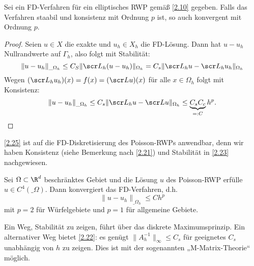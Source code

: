 
\begin{st}[Konvergenz] \label{2.25}
	Sei ein FD-Verfahren für ein elliptisches RWP gemäß \ref{2.10} gegeben.
	Falls das Verfahren staabil und konsistenz mit Ordnung $p$ ist, so auch konvergent mit Ordnung $p$.
	\begin{proof}
		Seien $u \in X$ die exakte und $u_h \in X_h$ die FD-Lösung.
		Dann hat $u - u_h$ Nullrandwerte auf $\Gamma_h$, also folgt mit Stabilität:
		\[
			\|u-u_h\|_{\_\Omega_h}
			\le C_S \| \scr L_h (u-u_h) \|_{\Omega_h}
			= C_s \|\scr L_h u - \scr L_h u_h\|_{\Omega_h}
		\]
		Wegen $(\scr L_h u_h)(x) = f(x) = (\scr L u)(x)$ für alle $x \in \Omega_h$ folgt mit Konsistenz:
		\[
			\|u - u_h\|_{\_\Omega_h}
			\le C_s \|\scr L_h u - \scr L u\|_{\Omega_h}
			\le \underbrace{C_s C_c}_{=:C} h^p.
		\]
	\end{proof}
\end{st}

\ref{2.25} ist auf die FD-Diskretisierung des Poisson-RWPs anwendbar, denn wir haben Konsistenz (siehe Bemerkung nach \ref{2.21}) und Stabilität in \ref{2.23} nachgewiesen.

\begin{kor} \label{2.26}
	Sei $\Omega \subset \R^d$ beschränktes Gebiet und die Lösung $u$ des Poisson-RWP erfülle $u \in C^4(\_\Omega)$.
	Dann konvergiert das FD-Verfahren, d.h.
	\[
		\|u - u_h\|_{\_\Omega_h}
		\le C h^p
	\]
	mit $p = 2$ für Würfelgebiete und $p = 1$ für allgemeine Gebiete.
\end{kor}

Ein Weg, Stabilität zu zeigen, führt über das diskrete Maximumsprinzip.
Ein alternativer Weg bietet \ref{2.22}:
es genügt $\|A_h^{-1}\|_\infty \le C_s$ für geeignetes $C_s$ unabhängig von $h$ zu zeigen.
Dies ist mit der sogenannten „M-Matrix-Theorie“ möglich.

